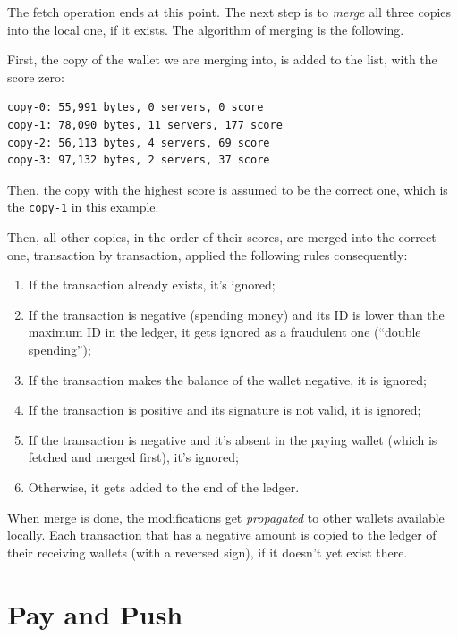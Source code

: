 \documentclass[11pt,oneside]{article}
\newcommand\dd[1]{\colorbox{gray!30}{\texttt{#1}}}
\begin{document}
The fetch operation ends at this point. The next step is to \emph{merge}
all three copies into the local one, if it exists. The algorithm of merging
is the following.

First, the copy of the wallet we are merging into, is added to the list,
with the score zero:

\begin{verbatim}
copy-0: 55,991 bytes, 0 servers, 0 score
copy-1: 78,090 bytes, 11 servers, 177 score
copy-2: 56,113 bytes, 4 servers, 69 score
copy-3: 97,132 bytes, 2 servers, 37 score
\end{verbatim}

Then, the copy with the highest score is assumed to be the correct one,
which is the \dd{copy-1} in this example.

Then, all other copies, in the order of their scores, are merged into the
correct one, transaction by transaction, applied the following rules
consequently:

\begin{enumerate}
\item If the transaction already exists, it's ignored;
\item If the transaction is negative (spending money) and its ID is lower than
the maximum ID in the ledger, it gets ignored as a fraudulent one (``double spending'');
\item If the transaction makes the balance of the wallet negative, it is ignored;
\item If the transaction is positive and its signature is not valid, it is ignored;
\item If the transaction is negative and it's absent in the paying wallet
(which is fetched and merged first), it's ignored;
\item Otherwise, it gets added to the end of the ledger.
\end{enumerate}

When merge is done, the modifications get \emph{propagated} to other wallets
available locally. Each transaction that has a negative amount is
copied to the ledger of their receiving wallets (with a reversed sign),
if it doesn't yet exist there.

\section{Pay and Push}
\end{document}
